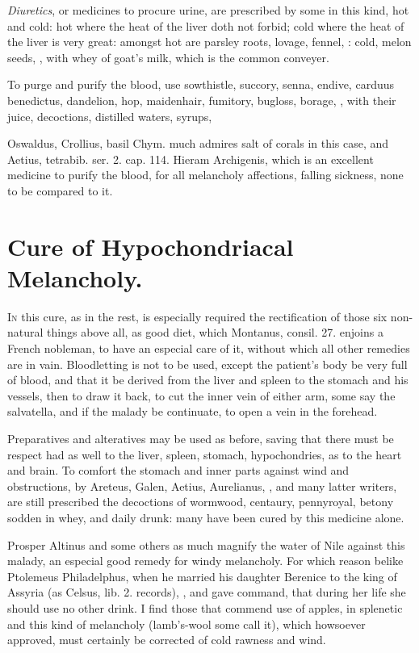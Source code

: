 \emph{Diuretics}, or medicines to procure urine, are prescribed by some in
this kind, hot and cold: hot where the heat of the liver doth not
forbid; cold where the heat of the liver is very great: amongst
hot are parsley roots, lovage, fennel, \etc{}: cold, melon seeds, \etc{},
with whey of goat's milk, which is the common conveyer.

To purge and purify the blood, use sowthistle, succory, senna,
endive, carduus benedictus, dandelion, hop, maidenhair, fumitory,
bugloss, borage, \etc{}, with their juice, decoctions, distilled waters,
syrups, \etc{}

Oswaldus, Crollius, basil Chym. much admires salt of corals in this
case, and Aetius, tetrabib. ser. 2. cap. 114. Hieram Archigenis, which
is an excellent medicine to purify the blood, for all melancholy
affections, falling sickness, none to be compared to it.


\section{Cure of Hypochondriacal Melancholy.}

\lettrine{I}{n} this cure, as in the rest, is especially required the rectification
of those six non-natural things above all, as good diet, which
Montanus, consil. 27. enjoins a French nobleman, to have an especial
care of it, without which all other remedies are in vain. Bloodletting
is not to be used, except the patient's body be very full of blood, and
that it be derived from the liver and spleen to the stomach and his
vessels, then to draw it back, to cut the inner vein of either
arm, some say the salvatella, and if the malady be continuate, to
open a vein in the forehead.

Preparatives and alteratives may be used as before, saving that there
must be respect had as well to the liver, spleen, stomach,
hypochondries, as to the heart and brain. To comfort the stomach
and inner parts against wind and obstructions, by Areteus, Galen,
Aetius, Aurelianus, \etc{}, and many latter writers, are still prescribed
the decoctions of wormwood, centaury, pennyroyal, betony sodden in
whey, and daily drunk: many have been cured by this medicine alone.

Prosper Altinus and some others as much magnify the water of Nile against this
malady, an especial good remedy for windy melancholy. For which reason belike
Ptolemeus Philadelphus, when he married his daughter Berenice to the king of
Assyria (as Celsus, lib. 2. records), , and
gave command, that during her life she should use no other drink. I find those
that commend use of apples, in splenetic and this kind of melancholy
(lamb's-wool some call it), which howsoever approved, must certainly be
corrected of cold rawness and wind.

